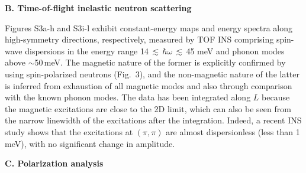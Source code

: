 \documentclass[twocolumn,prb,aps,showpacs]{revtex4-1}
\begin{document}
\vspace{10 pt}
\noindent
{\bf B. Time-of-flight inelastic neutron scattering}

Figures S3a-h and S3i-l exhibit constant-energy maps and energy spectra along high-symmetry directions, respectively, measured by TOF INS comprising spin-wave dispersions in the energy range 14\,$\lesssim$\,$\hbar\omega$\,$\lesssim$\,45 meV and phonon modes above $\sim$50\,meV. The magnetic nature of the former is explicitly confirmed by using spin-polarized neutrons (Fig.~3), and the non-magnetic nature of the latter is inferred from exhaustion of all magnetic modes and also through comparison with the known phonon modes. The data has been integrated along $L$ because the magnetic excitations are close to the 2D limit, which can also be seen from the narrow linewidth of the excitations after the integration. Indeed, a recent INS study shows that the excitations at $(\pi,\pi)$ are almost dispersionless (less than 1\,meV), with no significant change in amplitude\cite{Braden_2015}. 

\vspace{10 pt}
\noindent
{\bf C. Polarization analysis}
\end{document}
